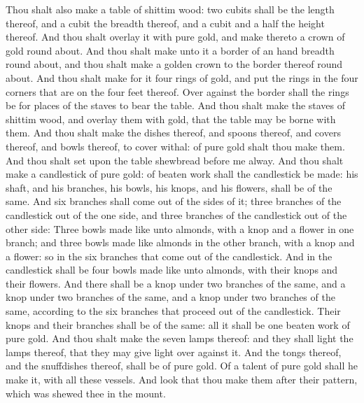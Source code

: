 \begin{biblechapter}
 Thou shalt also make a table of shittim wood: two cubits shall be the length thereof, and a cubit the breadth thereof, and a cubit and a half the height thereof.
\verse And thou shalt overlay it with pure gold, and make thereto a crown of gold round about.
\verse And thou shalt make unto it a border of an hand breadth round about, and thou shalt make a golden crown to the border thereof round about.
\verse And thou shalt make for it four rings of gold, and put the rings in the four corners that are on the four feet thereof.
\verse Over against the border shall the rings be for places of the staves to bear the table.
\verse And thou shalt make the staves of shittim wood, and overlay them with gold, that the table may be borne with them.
\verse And thou shalt make the dishes thereof, and spoons thereof, and covers thereof, and bowls thereof, to cover withal: of pure gold shalt thou make them.
\verse And thou shalt set upon the table shewbread before me alway.
 And thou shalt make a candlestick of pure gold: of beaten work shall the candlestick be made: his shaft, and his branches, his bowls, his knops, and his flowers, shall be of the same.
\verse And six branches shall come out of the sides of it; three branches of the candlestick out of the one side, and three branches of the candlestick out of the other side:
\verse Three bowls made like unto almonds, with a knop and a flower in one branch; and three bowls made like almonds in the other branch, with a knop and a flower: so in the six branches that come out of the candlestick.
\verse And in the candlestick shall be four bowls made like unto almonds, with their knops and their flowers.
\verse And there shall be a knop under two branches of the same, and a knop under two branches of the same, and a knop under two branches of the same, according to the six branches that proceed out of the candlestick.
\verse Their knops and their branches shall be of the same: all it shall be one beaten work of pure gold.
\verse And thou shalt make the seven lamps thereof: and they shall light the lamps thereof, that they may give light over against it.
\verse And the tongs thereof, and the snuffdishes thereof, shall be of pure gold.
\verse Of a talent of pure gold shall he make it, with all these vessels.
\verse And look that thou make them after their pattern, which was shewed thee in the mount.
\end{biblechapter}

